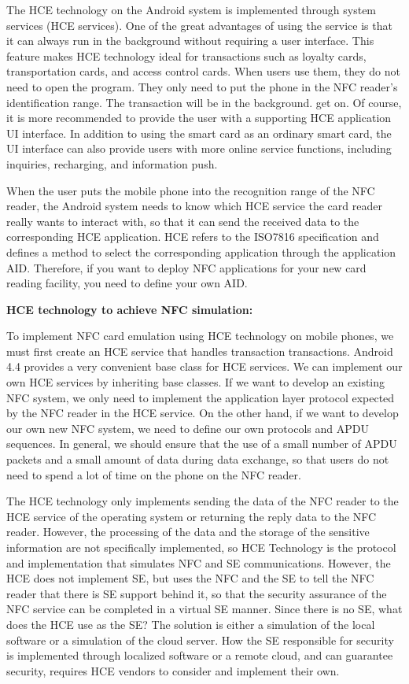 \documentclass[journal]{IEEEtran}
\begin{document}
The HCE technology on the Android system is implemented through system services (HCE services). One of the great advantages of using the service is that it can always run in the background without requiring a user interface. This feature makes HCE technology ideal for transactions such as loyalty cards, transportation cards, and access control cards. When users use them, they do not need to open the program. They only need to put the phone in the NFC reader's identification range. The transaction will be in the background. get on. Of course, it is more recommended to provide the user with a supporting HCE application UI interface. In addition to using the smart card as an ordinary smart card, the UI interface can also provide users with more online service functions, including inquiries, recharging, and information push.

When the user puts the mobile phone into the recognition range of the NFC reader, the Android system needs to know which HCE service the card reader really wants to interact with, so that it can send the received data to the corresponding HCE application. HCE refers to the ISO7816 specification and defines a method to select the corresponding application through the application AID. Therefore, if you want to deploy NFC applications for your new card reading facility, you need to define your own AID.

\textbf{HCE technology to achieve NFC simulation:}

To implement NFC card emulation using HCE technology on mobile phones, we must first create an HCE service that handles transaction transactions. Android 4.4 provides a very convenient base class for HCE services. We can implement our own HCE services by inheriting base classes. If we want to develop an existing NFC system, we only need to implement the application layer protocol expected by the NFC reader in the HCE service. On the other hand, if we want to develop our own new NFC system, we need to define our own protocols and APDU sequences. In general, we should ensure that the use of a small number of APDU packets and a small amount of data during data exchange, so that users do not need to spend a lot of time on the phone on the NFC reader.

The HCE technology only implements sending the data of the NFC reader to the HCE service of the operating system or returning the reply data to the NFC reader. However, the processing of the data and the storage of the sensitive information are not specifically implemented, so HCE Technology is the protocol and implementation that simulates NFC and SE communications. However, the HCE does not implement SE, but uses the NFC and the SE to tell the NFC reader that there is SE support behind it, so that the security assurance of the NFC service can be completed in a virtual SE manner. Since there is no SE, what does the HCE use as the SE? The solution is either a simulation of the local software or a simulation of the cloud server. How the SE responsible for security is implemented through localized software or a remote cloud, and can guarantee security, requires HCE vendors to consider and implement their own.
\end{document}
